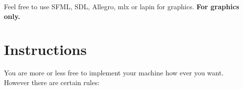 \documentclass{koala-en}
\begin{document}
Feel free to use SFML, SDL, Allegro, mlx or lapin for graphics.
\textbf{For graphics only.}

\chapter{Instructions}

    You are more or less free to implement your machine how ever you want.
  However there are certain rules:
\end{document}
